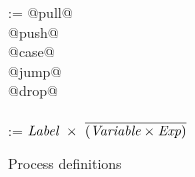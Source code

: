 \begin{figure}
\begin{minipage}[t]{0.4\textwidth}
\begin{tabbing}
\Instr
    \> :=\> @pull@  \> \Chan  \> \Var  \> \Next \\
    \TABALT @push@  \> \Chan  \> \Exp  \> \Next \\
    \TABALT @case@  \> \Exp   \> \Next \> \Next \\
    \TABALT @jump@  \>        \>       \> \Next \\
    \TABALT @drop@  \> \Chan  \>       \> \Next \\
\\[0.5em]
\Next \> := \> $\textit{Label}~\times~\overline{(\textit{Variable} \times \textit{Exp})}$ \\
\end{tabbing}
\end{minipage}
\caption{Process definitions}
\label{fig:Process:Def}
\end{figure}

